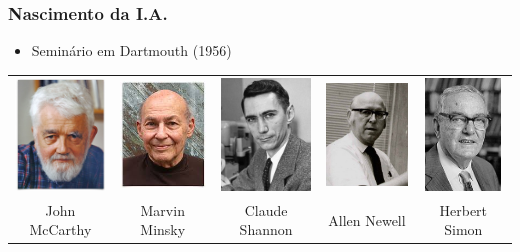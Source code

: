 \documentclass[aspectratio=169]{beamer}
\begin{document}
	\begin{frame}
		\frametitle{Nascimento da I.A.}
		\begin{itemize}
			\item Seminário em Dartmouth (1956)


		\end{itemize}
		\begin{adjustwidth}{-2.5em}{-2em}
			\begin{table}
				
				\centering
				\begin{tabular}{c c c c c}				
					\includegraphics[height=3cm, keepaspectratio]{../figs/cap01/mccarthy.jpg} & 				
					\includegraphics[height=3cm, keepaspectratio]{../figs/cap01/minsky.jpg} & 				
					\includegraphics[height=3cm, keepaspectratio]{../figs/cap01/shannon.jpg}& 				
					\includegraphics[height=3cm, keepaspectratio]{../figs/cap01/newell.jpg}& 				
					\includegraphics[height=3cm, keepaspectratio]{../figs/cap01/simon.jpg}\\	
					John McCarthy & Marvin Minsky & Claude Shannon & Allen Newell & Herbert Simon
					
				\end{tabular}
			\end{table}		
		\end{adjustwidth}

	\end{frame}	
\end{document}
